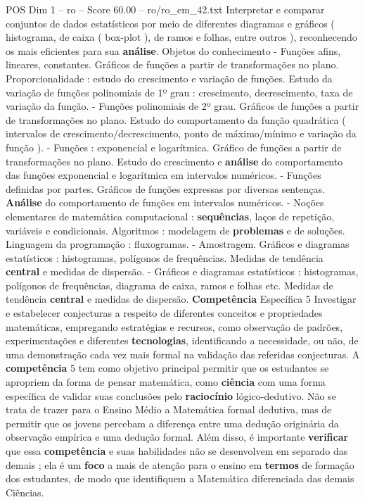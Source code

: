 \begin{textsample}{POS Dim 1 – ro – Score 60.00 – ro/ro\_em\_42.txt}
Interpretar e comparar conjuntos de dados estatísticos por meio de diferentes diagramas e gráficos ( histograma, de caixa ( box-plot ), de ramos e folhas, entre outros ), reconhecendo os mais eficientes para sua \textbf{análise}.
Objetos do conhecimento - Funções afins, lineares, constantes.
Gráficos de funções a partir de transformações no plano.
Proporcionalidade : estudo do crescimento e variação de funções.
Estudo da variação de funções polinomiais de 1º grau : crescimento, decrescimento, taxa de variação da função. - Funções polinomiais de 2º grau.
Gráficos de funções a partir de transformações no plano.
Estudo do comportamento da função quadrática ( intervalos de crescimento/decrescimento, ponto de máximo/mínimo e variação da função ). - Funções : exponencial e logarítmica.
Gráfico de funções a partir de transformações no plano.
Estudo do crescimento e \textbf{análise} do comportamento das funções exponencial e logarítmica em intervalos numéricos. - Funções definidas por partes.
Gráficos de funções expressas por diversas sentenças. \textbf{Análise} do comportamento de funções em intervalos numéricos. - Noções elementares de matemática computacional : \textbf{sequências}, laços de repetição, variáveis e condicionais.
Algoritmos : modelagem de \textbf{problemas} e de soluções.
Linguagem da programação : fluxogramas. - Amostragem.
Gráficos e diagramas estatísticos : histogramas, polígonos de frequências.
Medidas de tendência \textbf{central} e medidas de dispersão. - Gráficos e diagramas estatísticos : histogramas, polígonos de frequências, diagrama de caixa, ramos e folhas etc.
Medidas de tendência \textbf{central} e medidas de dispersão. \textbf{Competência} Específica 5 Investigar e estabelecer conjecturas a respeito de diferentes conceitos e propriedades matemáticas, empregando estratégias e recursos, como observação de padrões, experimentações e diferentes \textbf{tecnologias}, identificando a necessidade, ou não, de uma demonstração cada vez mais formal na validação das referidas conjecturas.
A \textbf{competência} 5 tem como objetivo principal permitir que os estudantes se apropriem da forma de pensar matemática, como \textbf{ciência} com uma forma específica de validar suas conclusões pelo \textbf{raciocínio} lógico-dedutivo.
Não se trata de trazer para o Ensino Médio a Matemática formal dedutiva, mas de permitir que os jovens percebam a diferença entre uma dedução originária da observação empírica e uma dedução formal.
Além disso, é importante \textbf{verificar} que essa \textbf{competência} e suas habilidades não se desenvolvem em separado das demais ; ela é um \textbf{foco} a mais de atenção para o ensino em \textbf{termos} de formação dos estudantes, de modo que identifiquem a Matemática diferenciada das demais Ciências.

\end{textsample}
